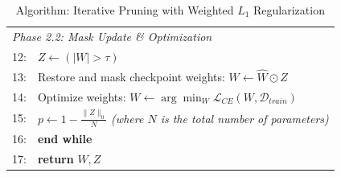 \begin{table}[H]
\begin{tabular}{@{}ll@{}}
        \multicolumn{2}{l}{\quad \textit{Phase 2.2: Mask Update \& Optimization}} \\
        12:& \quad $Z \gets (\lvert W \rvert > \tau)$ \\
        13:& \quad Restore and mask checkpoint weights: $W \gets \hat{W} \odot Z$ \\
        14:& \quad Optimize weights: $W \gets \arg\min_{W} \mathcal{L}_{CE}(W, \mathcal{D}_{train})$ \\
        15:& \quad $p \gets 1 - \frac{\|Z\|_0}{N}$ \quad \textit{(where $N$ is the total number of parameters)} \\
        16:& \textbf{end while} \\
        17:& \textbf{return} $W, Z$ \\
        \bottomrule
    \end{tabular}
    \caption{Algorithm: Iterative Pruning with Weighted $L_1$ Regularization}
    \label{tab:pruning_algorithm}
\end{table}